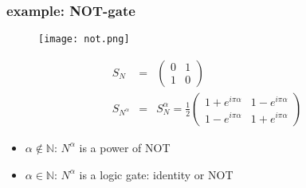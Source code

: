 \documentclass{beamer}
\begin{document}
\begin{frame}
	\frametitle{example: NOT-gate}
	\begin{figure}
		\centering
		\texttt{[image: not.png]}
	\end{figure}
	\begin{eqnarray}
		S_N&=&\begin{pmatrix}0&1\\1&0\end{pmatrix}\\
		S_{N^\alpha}&=&S_N^\alpha=\frac{1}{2}\begin{pmatrix}1+e^{i\pi\alpha}&1-e^{i\pi\alpha}\\1-e^{i\pi\alpha}&1+e^{i\pi\alpha}\end{pmatrix}
	\end{eqnarray}
	\begin{itemize}
		\item $\alpha\notin\mathbb{N}$: $N^\alpha$ is a power of NOT
		\item $\alpha\in\mathbb{N}$: $N^\alpha$ is a logic gate: identity or NOT
	\end{itemize}
\end{frame}
%
\end{document}
